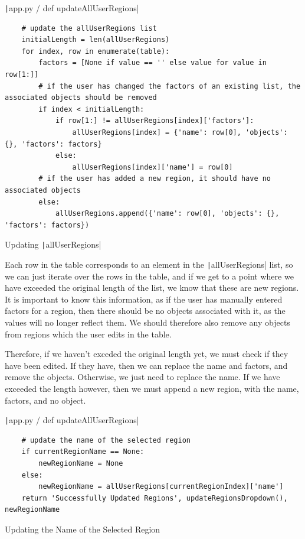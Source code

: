 \documentclass[12pt]{report}
\newcommand{\pil}[1]{\protect\texttt|#1|}
\begin{document}
\begin{listing}[H]
\pil{app.py / def updateAllUserRegions}
\begin{verbatim}
    # update the allUserRegions list
    initialLength = len(allUserRegions)
    for index, row in enumerate(table):
        factors = [None if value == '' else value for value in row[1:]]
        # if the user has changed the factors of an existing list, the associated objects should be removed
        if index < initialLength:
            if row[1:] != allUserRegions[index]['factors']:
                allUserRegions[index] = {'name': row[0], 'objects': {}, 'factors': factors}
            else:
                allUserRegions[index]['name'] = row[0]
        # if the user has added a new region, it should have no associated objects
        else:
            allUserRegions.append({'name': row[0], 'objects': {}, 'factors': factors})
\end{verbatim}
\caption{Updating \pil{allUserRegions}}\label{cs:updateAllUserRegions}
\end{listing}

Each row in the table corresponds to an element in the \pil{allUserRegions} list, so we can just iterate over the rows in the table, and if we get to a point where we have exceeded the original length of the list, we know that these are new regions. It is important to know this information, as if the user has manually entered factors for a region, then there should be no objects associated with it, as the values will no longer reflect them. We should therefore also remove any objects from regions which the user edits in the table.

Therefore, if we haven't exceded the original length yet, we must check if they have been edited. If they have, then we can replace the name and factors, and remove the objects. Otherwise, we just need to replace the name. If we have exceeded the length however, then we must append a new region, with the name, factors, and no object.

\begin{listing}[H]
\pil{app.py / def updateAllUserRegions}
\begin{verbatim}
    # update the name of the selected region
    if currentRegionName == None:
        newRegionName = None
    else:
        newRegionName = allUserRegions[currentRegionIndex]['name']
    return 'Successfully Updated Regions', updateRegionsDropdown(), newRegionName
\end{verbatim}
\caption{Updating the Name of the Selected Region}\label{cs:updateSelectedRegion}
\end{listing}
\end{document}
